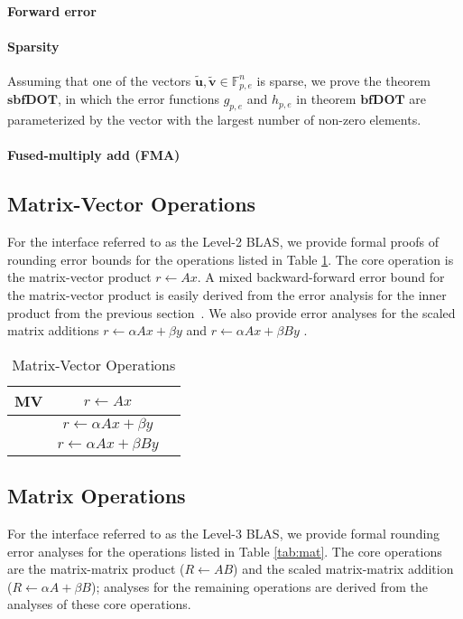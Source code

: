 \documentclass[conference]{IEEEtran}
\begin{document}
\paragraph{Forward error}
\paragraph{Sparsity} Assuming that one of the vectors $\tilde{\textbf{u}}, \tilde{\textbf{v}} \in \mathbb{F}_{p,e}^n$ is sparse, we prove the theorem $\textbf{sbfDOT}$, in which the error functions $g_{p,e}$ and $h_{p,e}$ in theorem $\textbf{bfDOT}$ are parameterized by the vector with the largest number of non-zero elements. 
\paragraph{Fused-multiply add (FMA)}


\subsection{Matrix-Vector Operations}\label{sec:matvec}
For the interface referred to as the Level-2 BLAS, we provide formal proofs of rounding error bounds for the operations listed in Table \ref{tab:matvec}. The core operation is the matrix-vector product $r \leftarrow  A x$. A mixed backward-forward error bound for the matrix-vector product is easily derived from the error analysis for the inner product from the previous section~\cite[sec 3.5]{higham_book}. We also provide error analyses for the scaled matrix additions $r  \leftarrow \alpha A x + \beta y$ and $r  \leftarrow \alpha A x + \beta B y$ .
\begin{table}[htbp]
\caption{Matrix-Vector Operations}
\begin{center}
\setlength{\tabcolsep}{0.5em} %
{\renewcommand{\arraystretch}{1.4}%
\begin{tabular}{|c|c|c|}
\hline
    MV & $r \leftarrow A x$   \\
\hline         
&  $ r  \leftarrow \alpha A x + \beta y$    \\ 
\hline
&  $r  \leftarrow \alpha A x + \beta B y$    \\ 
\hline
\end{tabular} }
\label{tab:matvec}
\end{center}
\end{table}

\subsection{Matrix Operations}\label{sec:mat}
For the interface referred to as the Level-3 BLAS, we provide formal rounding error analyses for the operations listed in Table \ref{tab:mat}. The core operations are the matrix-matrix product ($R \leftarrow  A B$) and the scaled matrix-matrix addition ($R \leftarrow \alpha A + \beta B$); analyses for the remaining operations are derived from the analyses of these core operations.
\end{document}
